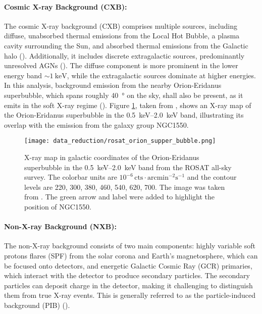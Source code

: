 \paragraph*{Cosmic X-ray Background (CXB):} The cosmic X-ray background (CXB) comprises multiple sources, including diffuse, unabsorbed thermal emissions from the Local Hot Bubble, a plasma cavity surrounding the Sun, and absorbed thermal emissions from the Galactic halo (\cite{galeazzi2006xmm}). Additionally, it includes discrete extragalactic sources, predominantly unresolved AGNs  (\cite{brandt2005deep}). The diffuse component is more prominent in the lower energy band \(\sim\SI{1}{\kilo\electronvolt}\), while the extragalactic sources dominate at higher energies. In this analysis, background emission from the nearby Orion-Eridanus superbubble, which spans roughly \SI{40}{\degree} on the sky, shall also be present, as it emits in the soft X-ray regime (\cite{Krause_2014}). Figure \ref{fig:orion_superbubble}, taken from \citep{Krause_2014}, shows an X-ray map of the Orion-Eridanus superbubble in the \SIrange{0.5}{2.0}{\kilo\electronvolt} band, illustrating its overlap with the emission from the galaxy group NGC1550.
\begin{figure}[htbp]
    \centering
    \texttt{[image: data\_reduction/rosat\_orion\_supper\_bubble.png]}
    \caption[X-ray map in galactic coordinates of the Orion-Eridanus superbubble.]{X-ray map in galactic coordinates of the Orion-Eridanus superbubble in the \SIrange{0.5}{2.0}{\kilo\electronvolt} band from the ROSAT all-sky survey. The colorbar units are \(10^{-6}\,\text{cts}\cdot\text{arcmin}^{-2}\text{s}^{-1}\) and the contour levels are 220, 300, 380,
    460, 540, 620, 700. The image was taken from \citep{Krause_2014}. The green arrow and label were added to highlight the position of NGC1550.}
    \label{fig:orion_superbubble}
\end{figure}
\paragraph*{Non-X-ray Background (NXB):} The non-X-ray background consists of two main components: highly variable soft protons flares (SPF) from the solar corona and Earth's magnetosphere, which can be focused onto detectors, and energetic Galactic Cosmic Ray (GCR) primaries, which interact with the detector to produce secondary particles. The secondary particles can deposit charge in the detector, making it challenging to distinguish them from true X-ray events. This is generally referred to as the particle-induced background (PIB) (\cite{Bulbul_2020}). 
